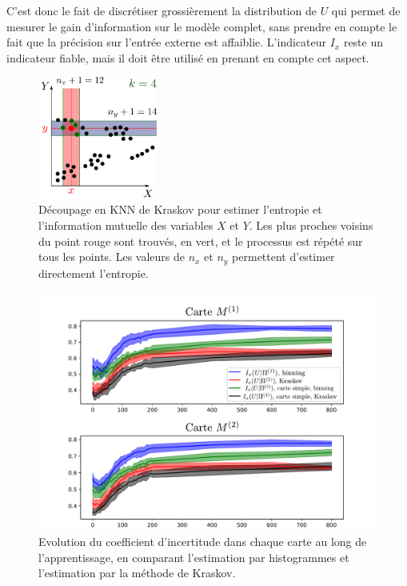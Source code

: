 C'est donc le fait de discrétiser grossièrement la distribution de $U$ qui permet de mesurer le gain d'information sur le modèle complet, sans prendre en compte le fait que la précision sur l'entrée externe est affaiblie. L'indicateur $I_x$ reste un indicateur fiable, mais il doit être utilisé en prenant en compte cet aspect.




\begin{figure}
    \centering
    \includegraphics[width=0.35\textwidth]{kraskov.pdf}
    \caption{Découpage en KNN de Kraskov pour estimer l'entropie et l'information mutuelle des variables $X$ et $Y$. Les plus proches voisins du point rouge sont trouvés, en vert, et le processus est répété sur tous les points. Les valeurs de $n_x$ et $n_y$ permettent d'estimer directement l'entropie.}
    \label{fig:kraskov}
\end{figure}

\begin{figure}
\includegraphics[width=\textwidth]{evolution_MI}
\caption{Evolution du coefficient d'incertitude dans chaque carte au long de l'apprentissage, en comparant l'estimation par histogrammes et l'estimation par la méthode de Kraskov.}
\label{fig:MI_evol_total}
\end{figure}


